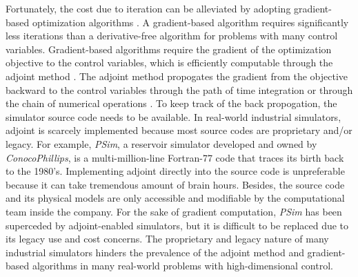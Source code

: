 Fortunately, the cost due to iteration can be alleviated by adopting gradient-based optimization algorithms \cite{opt via sim review}.
A gradient-based algorithm requires significantly less iterations than a derivative-free algorithm for problems with many control
variables. Gradient-based algorithms require the gradient of the optimization objective to the control variables, which is efficiently 
computable through the adjoint method \cite{adjoint}. The adjoint method propogates the gradient from the objective 
backward to the control variables through the path of time integration \cite{adjoint} or through the chain of numerical operations \cite{AD review}. 
To keep track of the back propogation, the simulator source code needs to be available.
In real-world industrial simulators, adjoint is scarcely implemented because most source codes are proprietary and/or legacy.
For example, \textit{PSim}, a reservoir simulator developed and owned by \textit{ConocoPhillips}, 
is a multi-million-line Fortran-77 code that traces its birth back to the 1980's. 
Implementing adjoint directly into the source code is unpreferable because it can take tremendous amount of brain hours.
Besides, the source code and its physical models are only accessible and modifiable by the computational team inside the company. 
For the sake of gradient computation, \textit{PSim} has been superceded by adjoint-enabled simulators, but it is
difficult to be replaced due to its legacy use and cost concerns.
The proprietary and legacy nature of many industrial simulators hinders the prevalence of the adjoint method 
and gradient-based algorithms in many real-world problems with high-dimensional control.\\

